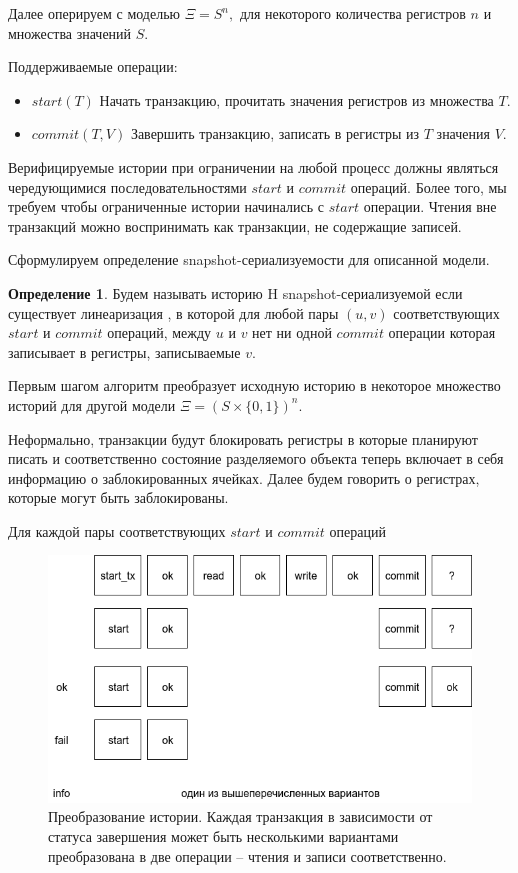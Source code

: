 \documentclass[pdftex,ptm,14pt,a4paper]{extreport}
\theoremstyle{definition}
\newtheorem{definition}{Определение}[chapter]
\begin{document}
Далее оперируем с моделью
$\Xi = S^n,$ для некоторого количества регистров $n$ и множества значений $S.$

Поддерживаемые операции:
\begin{itemize}
    \item{$start(T)$} Начать транзакцию, прочитать значения регистров из множества $T$.
    \item{$commit(T, V)$} Завершить транзакцию, записать в регистры из $T$ значения $V$.
\end{itemize}

Верифицируемые истории при ограничении на любой процесс должны являться чередующимися последовательностями
$start$ и $commit$ операций. Более того, мы требуем чтобы ограниченные истории начинались с $start$ операции.
Чтения вне транзакций можно воспринимать как транзакции, не содержащие записей.

Сформулируем определение snapshot-сериализуемости для описанной модели.

\begin{definition}
    \label{snapshot-def}
    Будем называть историю H snapshot-сериализуемой если существует линеаризация \cite{linearizable},
    в которой для любой пары $(u, v)$ соответствующих $start$ и $commit$ операций, между $u$ и $v$ нет ни одной
    $commit$ операции которая записывает в регистры, записываемые $v$.
\end{definition}

Первым шагом алгоритм преобразует исходную историю в некоторое множество историй для другой модели
$\Xi = (S\times\{0, 1\})^n.$

Неформально, транзакции будут блокировать регистры в которые планируют писать и соответственно
состояние разделяемого объекта теперь включает в себя информацию о заблокированных ячейках.
Далее будем говорить о регистрах, которые могут быть заблокированы.

Для каждой пары соответствующих $start$ и $commit$ операций

\begin{figure}
    \includegraphics[scale=0.5]{history-transform.png}
    \caption{Преобразование истории. Каждая транзакция  в зависимости от
        статуса завершения может быть несколькими вариантами преобразована в две операции --
        чтения и записи соответственно.}
\end{figure}
\end{document}
